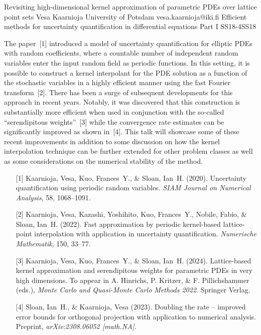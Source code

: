 \begin{talk}
  {Revisiting high-dimensional kernel approximation of parametric PDEs over lattice point sets}%
  {Vesa Kaarnioja}%
  {University of Potsdam}%
  {vesa.kaarnioja@iki.fi}%
  {}%
{Efficient methods for uncertainty quantification in differential equations Part I}
{}{SS18-4}{SS18}

			
The paper~[1] introduced a model of uncertainty quantification for elliptic PDEs with random coefficients, where a countable number of independent random variables enter the input random field as periodic functions. In this setting, it is possible to construct a kernel interpolant for the PDE solution as a function of the stochastic variables in a highly efficient manner using the fast Fourier transform~[2]. There has been a surge of subsequent developments for this approach in recent years. Notably, it was discovered that this construction is substantially more efficient when used in conjunction with the so-called ``serendipitous weights''~[3] while the convergence rate estimates can be significantly improved as shown in~[4]. This talk will showcase some of these recent improvements in addition to some discussion on how the kernel interpolation technique can be further extended for other problem classes as well as some considerations on the numerical stability of the method.
\begin{enumerate}
	\item[{[1]}] Kaarnioja, Vesa, Kuo, Frances~Y., \& Sloan, Ian~H. (2020). Uncertainty quantification using periodic random variables. {\it SIAM Journal on Numerical Analysis}, 58, 1068--1091.
    \item[{[2]}] Kaarnioja, Vesa, Kazashi, Yoshihito, Kuo, Frances~Y., Nobile, Fabio, \& Sloan, Ian~H. (2022). Fast approximation by periodic kernel-based lattice-point interpolation with application in uncertainty quantification. {\it Numerische Mathematik}, 150, 33--77.
	\item[{[3]}] Kaarnioja, Vesa, Kuo, Frances~Y., \& Sloan, Ian~H. (2024). Lattice-based kernel approximation and serendipitous weights for parametric PDEs in very high dimensions. To appear in A. Hinrichs, P. Kritzer, \& F. Pillichshammer (eds.), {\it Monte Carlo and Quasi-Monte Carlo Methods 2022}. Springer Verlag.
	\item[{[4]}] Sloan, Ian~H., \& Kaarnioja, Vesa (2023). Doubling the rate -- improved error bounds for orthogonal projection with application to numerical analysis. Preprint, {\it arXiv:2308.06052 [math.NA]}.
\end{enumerate}
\end{talk}

